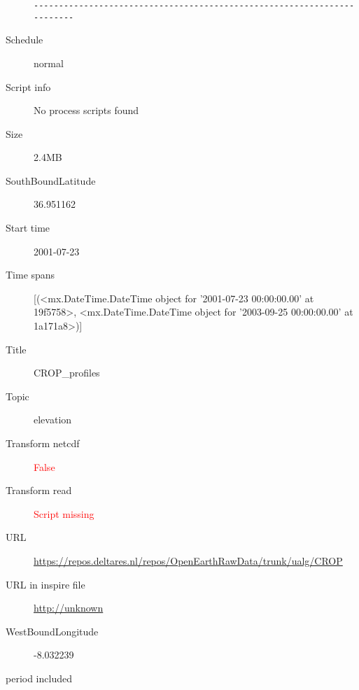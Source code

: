 \documentclass[9]{report}
\begin{document}
\begin{description}
\begin{verbatim}
------------------------------------------------------------------------

\end{verbatim}
  \item[Schedule] normal
  \item[Script info] No process scripts found
  \item[Size] 2.4MB
  \item[SouthBoundLatitude] 36.951162
  \item[Start time] 2001-07-23
  \item[Time spans] [(<mx.DateTime.DateTime object for '2001-07-23 00:00:00.00' at 19f5758>, <mx.DateTime.DateTime object for '2003-09-25 00:00:00.00' at 1a171a8>)]
  \item[Title]  CROP\_profiles 
  \item[Topic] elevation
  \item[Transform netcdf] \textcolor{red}{False}
  \item[Transform read] \textcolor{red}{Script missing}
  \item[URL] \href{https://repos.deltares.nl/repos/OpenEarthRawData/trunk/ualg/CROP}{https://repos.deltares.nl/repos/OpenEarthRawData/trunk/ualg/CROP}
  \item[URL in inspire file] \href{http://unknown}{http://unknown}
  \item[WestBoundLongitude] -8.032239
  \item[period included] 
\end{description}
\end{document}
